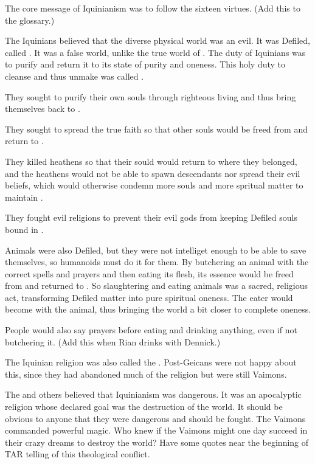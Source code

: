   The core message of Iquinianism was to follow the sixteen virtues.
  (Add this to the glossary.)
  
  The Iquinians believed that the diverse physical world was an evil.
  It was Defiled, called \Gehinnom. 
  It was a false world, unlike the true world of \Atziluth. 
  The duty of Iquinians was to purify \Gehinnom and return it to its state of purity and oneness.
  This holy duty to cleanse and thus unmake \Gehinnom was called \tikkun.
    \item 
      They sought to purify their own souls through righteous living and thus bring themselves back to \iquin.
    \item 
      They sought to spread the true faith so that other souls would be freed from \Gehinnom and return to \iquin.
    \item 
      They killed heathens so that their sould would return to \itzach where they belonged, and the heathens would not be able to spawn descendants nor spread their evil beliefs, which would otherwise condemn more souls and more spritual matter to maintain \Gehinnom. 
    \item 
      They fought evil religions to prevent their evil gods from keeping Defiled souls bound in \Gehinnom. 
  
  Animals were also Defiled, but they were not intelliget enough to be able to save themselves, so humanoids must do it for them.
  By butchering an animal with the correct spells and prayers and then eating its flesh, its essence would be freed from \Gehinnom and returned to \iquin. 
  So slaughtering and eating animals was a sacred, religious act, transforming Defiled matter into pure spiritual oneness. 
  The eater would become  with the animal, thus bringing the world a bit closer to complete oneness.
  
  People would also say prayers before eating and drinking anything, even if not butchering it.
  (Add this when Rian drinks with Dennick.)
  
  The Iquinian religion was also called the .
  Post-\caliphate Geicans were not happy about this, since they had abandoned much of the religion but were still Vaimons.
  
  The \rethyaxes and others believed that Iquinianism was dangerous.
  It was an apocalyptic religion whose declared goal was the destruction of the world.
  It should be obvious to anyone that they were dangerous and should be fought.
  The Vaimons commanded powerful magic. 
  Who knew if the Vaimons might one day succeed in their crazy dreams to destroy the world?
  Have some quotes near the beginning of TAR telling of this theological conflict. 
  
